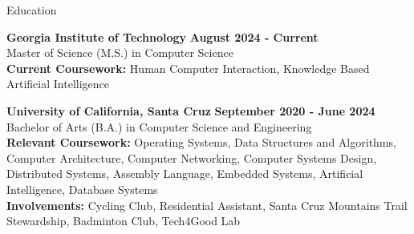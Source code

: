 \documentclass{resume}
\begin{document}
\begin{rSection}{\large Education}

{\bf Georgia Institute of Technology} \hfill {\bf{August 2024 - Current}}
\\ Master of Science (M.S.) in Computer Science\hfill %
\\ \textbf{Current Coursework:} Human Computer Interaction, Knowledge Based Artificial Intelligence


{\bf University of California, Santa Cruz} \hfill {\bf{September 2020 - June 2024}}
\\ Bachelor of Arts (B.A.) in Computer Science and Engineering\hfill %
\\ \textbf{Relevant Coursework:} Operating Systems, Data Structures and Algorithms, Computer Architecture, Computer Networking, Computer Systems Design, Distributed Systems, Assembly Language, Embedded Systems, Artificial Intelligence, Database Systems
\\ \textbf{Involvements:} Cycling Club, Residential Assistant, Santa Cruz Mountains Trail Stewardship, Badminton Club, Tech4Good Lab

\end{rSection}
\end{document}
